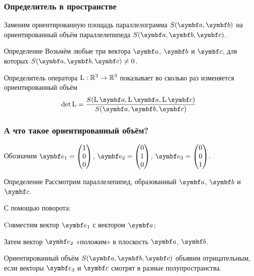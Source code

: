 \begin{frame}
    \frametitle{Определитель в пространстве}

    Заменим ориентированную площадь параллелограмма $S(\ba, \bb)$ 
    на ориентированный объём параллелепипеда $S(\ba, \bb, \bc)$.
    
    \pause

\begin{block}{Определение}
    Возьмём любые три вектора $\ba$, $\bb$ и $\bc$, для которых $S(\ba, \bb, \bc)\neq 0$.

    \alert{Определитель} оператора $\operatorname{L}:\mathbb{R}^3 \to \mathbb{R}^3$ показывает во сколько раз изменяется
    ориентированный объём
    \[
    \det \LL = \frac{S(\LL\ba, \LL\ba, \LL\bc)}{S(\ba, \bb, \bc)}    
    \]
\end{block} 


\end{frame}



\begin{frame}
    \frametitle{А что такое ориентированный объём?}

\pause 

Обозначим $\be_1 = \begin{pmatrix}
    1 \\
    0 \\
    0 \\
\end{pmatrix}$, $\be_2 = \begin{pmatrix}
    0 \\
    1 \\
    0
\end{pmatrix}$, $\be_3 = \begin{pmatrix}
    0 \\
    0 \\
    1 \\
\end{pmatrix}$.



\pause

\begin{block}{Определение}
    Рассмотрим параллелепипед, образованный $\ba$, $\bb$ и $\bc$.

    \pause

    С помощью поворота: 

    Cовместим вектор $\be_1$ с вектором $\ba$;

    Затем вектор $\be_2$ «положим» в плоскость $\ba$, $\bb$.

    \pause

    \alert{Ориентированный объём} $S(\ba, \bb, \bc)$ объявим отрицательным,
    если векторы $\be_3$ и $\bc$ смотрят в разные полупространства.
    
\end{block}


\end{frame}


